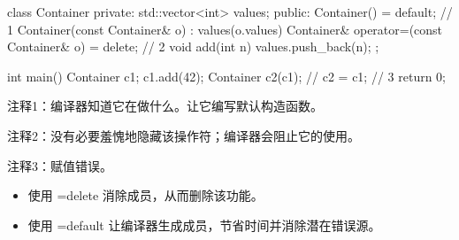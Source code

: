
\begin{cpp}
class Container {
private:
  std::vector<int> values;
public:
  Container() = default; // 1
  Container(const Container& o) : values(o.values) {}
  Container& operator=(const Container& o) = delete; // 2
  void add(int n) { values.push_back(n); }
};

int main() {
  Container c1;
  c1.add(42);
  Container c2(c1);
  // c2 = c1; // 3
  return 0;
}
\end{cpp}

{\footnotesize
注释1：编译器知道它在做什么。让它编写默认构造函数。

注释2：没有必要羞愧地隐藏该操作符；编译器会阻止它的使用。

注释3：赋值错误。
}


\begin{itemize}
\item
使用 =delete 消除成员，从而删除该功能。

\item
使用 =default 让编译器生成成员，节省时间并消除潜在错误源。
\end{itemize}




























